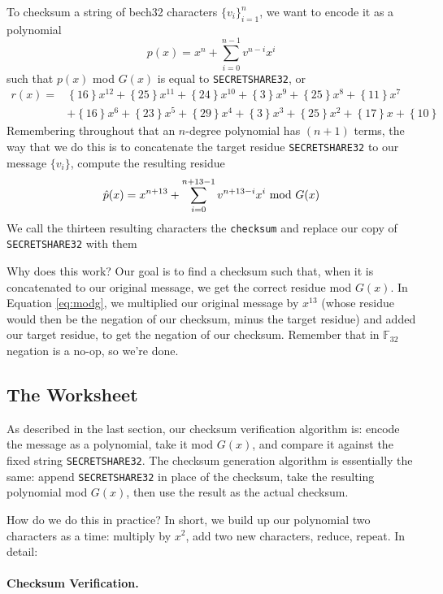 \documentclass[letterpaper]{article}
\theoremstyle{xxx}
\theoremstyle{evil}
\theoremstyle{yyy}
\theoremstyle{plain}
\theoremstyle{zzz}
\newcommand{\fttwo}{\mathbb{F}_{32}}
\newcommand{\binrep}[1]{\left\{#1\right\}}
\begin{document}
To checksum a string of bech32 characters $\{v_i\}_{i=1}^n$, we want to encode it
as a polynomial
\[ p(x) = x^n + \sum_{i=0}^{n-1} v^{n-i} x^i \]
such that $p(x)$ mod $G(x)$ is equal to \texttt{SECRETSHARE32}, or
\begin{align*}
r(x) =
    &\binrep{16}x^{12} + \binrep{25}x^{11} + \binrep{24}x^{10} + \binrep{3}x^9 + \binrep{25}x^8 + \binrep{11}x^7\\
    &+ \binrep{16}x^6 + \binrep{23}x^5 + \binrep{29}x^4 + \binrep{3}x^3 + \binrep{25}x^2 + \binrep{17}x + \binrep{10}
\end{align*}
Remembering throughout that an $n$-degree polynomial has $(n+1)$ terms, the way that
we do this is to concatenate the target residue \texttt{SECRETSHARE32} to our message
$\{ v_i \}$, compute the resulting residue
\begin{equation}
 \hat{p}(x) = x^{n+13} + \sum_{i=0}^{n+13-1} v^{n+13-i} x^{i} \textnormal{ mod } G(x)
 \label{eq:modg}
\end{equation}
We call the thirteen resulting characters the \texttt{checksum} and replace our
copy of \texttt{SECRETSHARE32} with them

Why does this work? Our goal is to find a checksum such that, when it is concatenated
to our original message, we get the correct residue mod $G(x)$. In Equation \eqref{eq:modg},
we multiplied our original message by $x^{13}$ (whose residue would then be the negation
of our checksum, minus the target residue) and added our target residue, to get the
negation of our checksum. Remember that in $\fttwo$ negation is a no-op, so we're done.

\subsection{The Worksheet}

As described in the last section, our checksum verification algorithm is: encode the
message as a polynomial, take it mod $G(x)$, and compare it against the fixed string
\texttt{SECRETSHARE32}. The checksum generation algorithm is essentially the same:
append \texttt{SECRETSHARE32} in place of the checksum, take the resulting polynomial
mod $G(x)$, then use the result as the actual checksum.

How do we do this in practice? In short, we build up our polynomial two characters
as a time: multiply by $x^2$, add two new characters, reduce, repeat. In detail:

\paragraph{Checksum Verification.}
\end{document}
